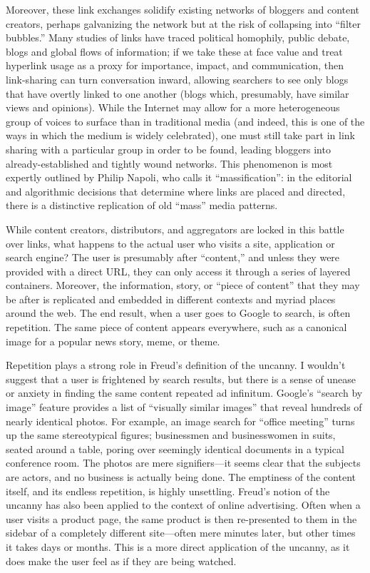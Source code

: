 Moreover, these link exchanges solidify existing networks of bloggers and content creators, perhaps galvanizing the network but at the risk of collapsing into “filter bubbles.” Many studies of links have traced political homophily, public debate, blogs and global flows of information; if we take these at face value and treat hyperlink usage as a proxy for importance, impact, and communication, then link-sharing can turn conversation inward, allowing searchers to see only blogs that have overtly linked to one another (blogs which, presumably, have similar views and opinions).  While the Internet may allow for a more heterogeneous group of voices to surface than in traditional media (and indeed, this is one of the ways in which the medium is widely celebrated), one must still take part in link sharing with a particular group in order to be found, leading bloggers into already-established and tightly wound networks. This phenomenon is most expertly outlined by Philip Napoli, who calls it “massification”: in the editorial and algorithmic decisions that determine where links are placed and directed, there is a distinctive replication of old “mass” media patterns. 

While content creators, distributors, and aggregators are locked in this battle over links, what happens to the actual user who visits a site, application or search engine? The user is presumably after “content,” and unless they were provided with a direct URL, they can only access it through a series of layered containers. Moreover, the information, story, or “piece of content” that they may be after is replicated and embedded in different contexts and myriad places around the web. The end result, when a user goes to Google to search, is often repetition. The same piece of content appears everywhere, such as a canonical image for a popular news story, meme, or theme.

Repetition plays a strong role in Freud’s definition of the uncanny. I wouldn’t suggest that a user is frightened by search results, but there is a sense of unease or anxiety in finding the same content repeated ad infinitum. Google’s “search by image” feature provides a list of “visually similar images” that reveal hundreds of nearly identical photos. For example, an image search for “office meeting” turns up the same stereotypical figures; businessmen and businesswomen in suits, seated around a table, poring over seemingly identical documents in a typical conference room. The photos are mere signifiers—it seems clear that the subjects are actors, and no business is actually being done. The emptiness of the content itself, and its endless repetition, is highly unsettling. Freud’s notion of the uncanny has also been applied to the context of online advertising. Often when a user visits a product page, the same product is then re-presented to them in the sidebar of a completely different site—often mere minutes later, but other times it takes days or months. This is a more direct application of the uncanny, as it does make the user feel as if they are being watched. 

